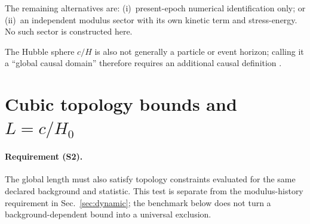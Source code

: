 \documentclass[aps,prd,reprint,superscriptaddress,nofootinbib,floatfix,showkeys]{revtex4-2}
\newcommand{\Hzero}{H_{0}}
\begin{document}
The remaining alternatives are: (i)~present-epoch numerical identification
only; or (ii)~an independent modulus sector with its own kinetic term and
stress-energy.  No such sector is constructed here.

The Hubble sphere \(c/H\) is also not generally a particle or event horizon;
calling it a ``global causal domain'' therefore requires an additional causal
definition \cite{davis_lineweaver_horizon}.

\section{Cubic topology bounds and \texorpdfstring{\(L=c/\Hzero\)}{L = c/H0}}
\label{sec:bounds}

\paragraph{Requirement (S2).}
The global length must also satisfy topology constraints evaluated for the
same declared background and statistic.  This test is separate from the
modulus-history requirement in Sec.~\ref{sec:dynamic}; the benchmark below
does not turn a background-dependent bound into a universal exclusion.
\end{document}
